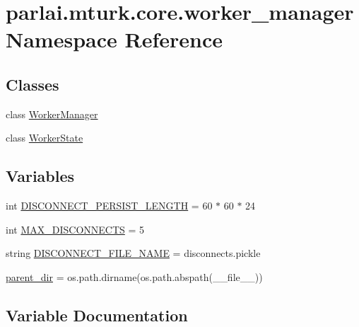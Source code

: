 \hypertarget{namespaceparlai_1_1mturk_1_1core_1_1worker__manager}{}\section{parlai.\+mturk.\+core.\+worker\+\_\+manager Namespace Reference}
\label{namespaceparlai_1_1mturk_1_1core_1_1worker__manager}
\subsection*{Classes}
\begin{DoxyCompactItemize}
\item 
class \hyperlink{classparlai_1_1mturk_1_1core_1_1worker__manager_1_1WorkerManager}{Worker\+Manager}
\item 
class \hyperlink{classparlai_1_1mturk_1_1core_1_1worker__manager_1_1WorkerState}{Worker\+State}
\end{DoxyCompactItemize}
\subsection*{Variables}
\begin{DoxyCompactItemize}
\item 
int \hyperlink{namespaceparlai_1_1mturk_1_1core_1_1worker__manager_aea08a2153a6e9b343c3819f8437f4253}{D\+I\+S\+C\+O\+N\+N\+E\+C\+T\+\_\+\+P\+E\+R\+S\+I\+S\+T\+\_\+\+L\+E\+N\+G\+TH} = 60 $\ast$ 60 $\ast$ 24
\item 
int \hyperlink{namespaceparlai_1_1mturk_1_1core_1_1worker__manager_a97194652899b067648832eaaf8eda838}{M\+A\+X\+\_\+\+D\+I\+S\+C\+O\+N\+N\+E\+C\+TS} = 5
\item 
string \hyperlink{namespaceparlai_1_1mturk_1_1core_1_1worker__manager_affe4aec534b42d99a874f863d7d85e62}{D\+I\+S\+C\+O\+N\+N\+E\+C\+T\+\_\+\+F\+I\+L\+E\+\_\+\+N\+A\+ME} = \textquotesingle{}disconnects.\+pickle\textquotesingle{}
\item 
\hyperlink{namespaceparlai_1_1mturk_1_1core_1_1worker__manager_ad55d781239dedaf5a8409f99a5b181ed}{parent\+\_\+dir} = os.\+path.\+dirname(os.\+path.\+abspath(\+\_\+\+\_\+file\+\_\+\+\_\+))
\end{DoxyCompactItemize}


\subsection{Variable Documentation}
\mbox{\label{namespaceparlai_1_1mturk_1_1core_1_1worker__manager_affe4aec534b42d99a874f863d7d85e62}} 
